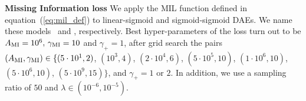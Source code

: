 \textbf{Missing Information loss} We apply the \textsc{MIL} function defined in equation~(\ref{eq:mil_def}) to linear-sigmoid and sigmoid-sigmoid DAEs. We name these models \MILlinsig\, and \MILsigsig, respectively. Best hyper-parameters of the loss turn out to be $A_{\rm MI}=10^6,\, \gamma_{\rm MI}=10$ and $\gamma_{+}=1$, after grid search the pairs $\left(A_{\rm MI}, \gamma_{\rm MI}\right)\in\{
(5\cdot10^1, 2)$, $(10^3, 4)$, $(2\cdot10^4, 6)$, $(5\cdot10^5, 10)$, $(1\cdot10^6, 10)$, $(5\cdot10^6, 10)$, $(5\cdot10^9, 15)\}$, and $\gamma_{+}=1$ or $2$. In addition, we use a sampling ratio of $50$ and $\lambda\in(10^{-6}, 10^{-5})$.